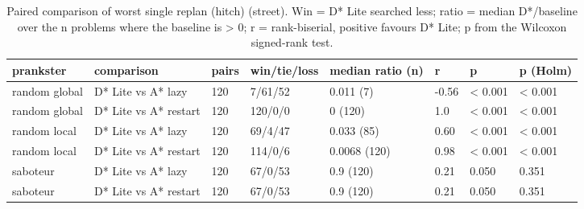 \begin{table}[t]
\centering
\small
\caption{Paired comparison of worst single replan (hitch) (street). Win = D* Lite searched less; ratio = median D*/baseline over the n problems where the baseline is > 0; r = rank-biserial, positive favours D* Lite; p from the Wilcoxon signed-rank test.}
\label{tab:tests-hitch-street}
\begin{tabular}{llllllll}
\toprule
prankster & comparison & pairs & win/tie/loss & median ratio (n) & r & p & p (Holm) \\
\midrule
random global & D* Lite vs A* lazy & 120 & 7/61/52 & 0.011 (7) & -0.56 & < 0.001 & < 0.001 \\
random global & D* Lite vs A* restart & 120 & 120/0/0 & 0 (120) & 1.0 & < 0.001 & < 0.001 \\
random local & D* Lite vs A* lazy & 120 & 69/4/47 & 0.033 (85) & 0.60 & < 0.001 & < 0.001 \\
random local & D* Lite vs A* restart & 120 & 114/0/6 & 0.0068 (120) & 0.98 & < 0.001 & < 0.001 \\
saboteur & D* Lite vs A* lazy & 120 & 67/0/53 & 0.9 (120) & 0.21 & 0.050 & 0.351 \\
saboteur & D* Lite vs A* restart & 120 & 67/0/53 & 0.9 (120) & 0.21 & 0.050 & 0.351 \\
\bottomrule
\end{tabular}
\end{table}
